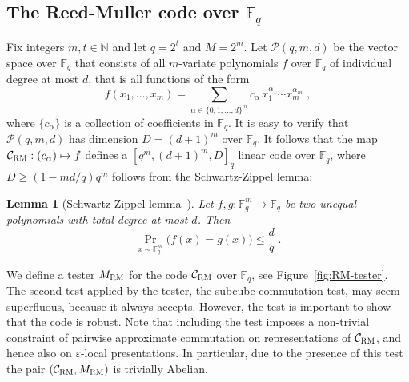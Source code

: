 \documentclass[11pt]{article}
\newtheorem{lemma}[theorem]{Lemma}
\theoremstyle{definition}
\newcommand{\code}{\mathcal{C}}
\newcommand{\N}{\ensuremath{\mathbb{N}}}
\newcommand{\F}{\ensuremath{\mathbb{F}}}
\newcommand{\mC}{\ensuremath{\mathcal{C}}}
\newcommand{\mP}{\ensuremath{\mathcal{P}}}
\newcommand{\RM}{\ensuremath{\textsc{RM}}}
\newcommand{\eps}{\varepsilon}
\begin{document}
\subsection{The Reed-Muller code over $\F_q$}

Fix integers $m,t \in \N$ and let $q=2^t$ and $M = 2^m$. Let $\mP(q,m,d)$ be the vector space over $\F_q$ that consists of all $m$-variate polynomials $f$ over $\F_q$ of individual degree at most $d$, that is all functions of the form
\[
	f(x_1,\ldots,x_m) = \sum_{\alpha \in \{0,1,\ldots,d\}^m} c_\alpha\,
  x_1^{\alpha_1} \cdots x_m^{\alpha_m}\;,
\]
where $\{c_\alpha\}$ is a collection of coefficients in $\F_q$. It is easy to verify that $\mP(q,m,d)$ has dimension $D = (d+1)^m$ over $\F_q$. It follows that the map $\mC_\RM: (c_\alpha) \mapsto f$ defines a $[q^m,(d+1)^m,D]_q$ linear code over $\F_q$, where $D\geq (1-md/q)q^m$ follows from the Schwartz-Zippel lemma: 

\begin{lemma}[Schwartz-Zippel lemma~\cite{Sch80,Zip79}]
  \label{lem:schwartz-zippel}
  Let $f, g: \F_q^m \to \F_q$ be two unequal polynomials with total degree at most $d$. Then
  \begin{equation*}
    \Pr_{x \sim \F_q^m}\big(f(x) = g(x)\big) \leq \frac{d}{q}\;.
  \end{equation*}
\end{lemma}


We define a tester $M_{\RM}$ for the code $\mC_\RM$ over $\F_q$, see Figure~\ref{fig:RM-tester}. The second test applied by the tester, the subcube commutation test, may seem superfluous, because it always accepts. However, the test is important to show that the code is robust. Note that including the test imposes a non-trivial constraint of pairwise approximate commutation on representations of $\mC_\RM$, and hence also on $\eps$-local presentations. In particular, due to the presence of this test the pair $(\code_\RM,M_\RM)$ is trivially Abelian. 
\end{document}
